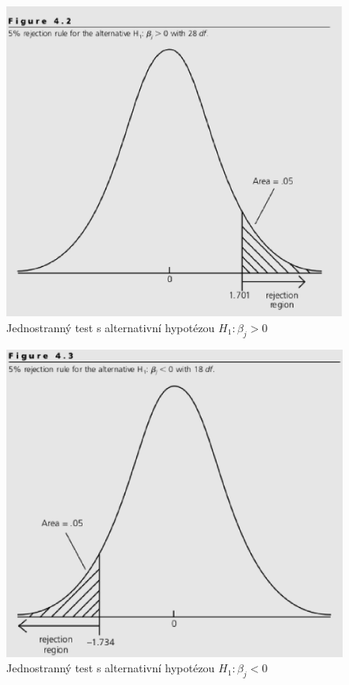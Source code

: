 \begin{figure}[htp]
\centering
\includegraphics[scale = 0.5]{pictures/figure_4_2.eps}
\caption{Jednostranný test s alternativní hypotézou $H_1: \beta_j > 0$}
\label{figure_4_2}
\end{figure}

\begin{figure}[htp]
\centering
\includegraphics[scale = 0.5]{pictures/figure_4_3.eps}
\caption{Jednostranný test s alternativní hypotézou $H_1: \beta_j < 0$}
\label{figure_4_3}
\end{figure} 

